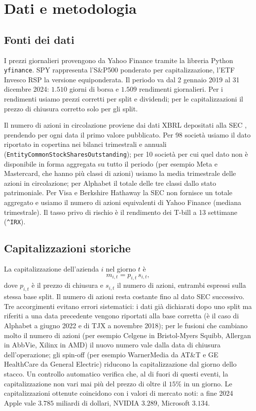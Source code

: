 \documentclass[12pt, a4paper]{article}
\begin{document}
\section{Dati e metodologia}

\subsection{Fonti dei dati}

I prezzi giornalieri provengono da Yahoo Finance tramite la libreria Python \texttt{yfinance}. SPY rappresenta l'S\&P500 ponderato per capitalizzazione, l'ETF Invesco RSP la versione equiponderata. Il periodo va dal 2 gennaio 2019 al 31 dicembre 2024: $1.510$ giorni di borsa e $1.509$ rendimenti giornalieri. Per i rendimenti usiamo prezzi corretti per split e dividendi; per le capitalizzazioni il prezzo di chiusura corretto solo per gli split.

Il numero di azioni in circolazione proviene dai dati XBRL depositati alla SEC \citep{secedgar}, prendendo per ogni data il primo valore pubblicato. Per 98 societ\`a usiamo il dato riportato in copertina nei bilanci trimestrali e annuali (\texttt{EntityCommonStockSharesOutstanding}); per 10 societ\`a per cui quel dato non \`e disponibile in forma aggregata su tutto il periodo (per esempio Meta e Mastercard, che hanno pi\`u classi di azioni) usiamo la media trimestrale delle azioni in circolazione; per Alphabet il totale delle tre classi dallo stato patrimoniale. Per Visa e Berkshire Hathaway la SEC non fornisce un totale aggregato e usiamo il numero di azioni equivalenti di Yahoo Finance (mediana trimestrale). Il tasso privo di rischio \`e il rendimento dei T-bill a 13 settimane (\texttt{\^{}IRX}).

\subsection{Capitalizzazioni storiche}

La capitalizzazione dell'azienda $i$ nel giorno $t$ \`e
\begin{equation}
  m_{i,t} = p_{i,t}\, s_{i,t},
\end{equation}
dove $p_{i,t}$ \`e il prezzo di chiusura e $s_{i,t}$ il numero di azioni, entrambi espressi sulla stessa base split. Il numero di azioni resta costante fino al dato SEC successivo. Tre accorgimenti evitano errori sistematici: i dati gi\`a dichiarati dopo uno split ma riferiti a una data precedente vengono riportati alla base corretta (\`e il caso di Alphabet a giugno 2022 e di TJX a novembre 2018); per le fusioni che cambiano molto il numero di azioni (per esempio Celgene in Bristol-Myers Squibb, Allergan in AbbVie, Xilinx in AMD) il nuovo numero vale dalla data di chiusura dell'operazione; gli spin-off (per esempio WarnerMedia da AT\&T e GE HealthCare da General Electric) riducono la capitalizzazione dal giorno dello stacco. Un controllo automatico verifica che, al di fuori di questi eventi, la capitalizzazione non vari mai pi\`u del prezzo di oltre il $15\%$ in un giorno. Le capitalizzazioni ottenute coincidono con i valori di mercato noti: a fine 2024 Apple vale $3.785$ miliardi di dollari, NVIDIA $3.289$, Microsoft $3.134$.
\end{document}
